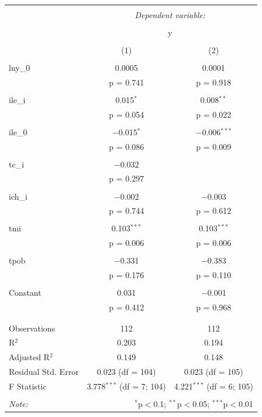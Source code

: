 \begin{table}[!htbp] \centering 
    \tiny
  \caption{} 
  \label{} 
\begin{tabular}{@{\extracolsep{5pt}}lcc} 
\\[-1.8ex]\hline 
\hline \\[-1.8ex] 
 & \multicolumn{2}{c}{\textit{Dependent variable:}} \\ 
\cline{2-3} 
\\[-1.8ex] & \multicolumn{2}{c}{y} \\ 
\\[-1.8ex] & (1) & (2)\\ 
\hline \\[-1.8ex] 
 lny\_0 & 0.0005 & 0.0001 \\ 
  & p = 0.741 & p = 0.918 \\ 
  & & \\ 
 ile\_i & 0.015$^{*}$ & 0.008$^{**}$ \\ 
  & p = 0.054 & p = 0.022 \\ 
  & & \\ 
 ile\_0 & $-$0.015$^{*}$ & $-$0.006$^{***}$ \\ 
  & p = 0.086 & p = 0.009 \\ 
  & & \\ 
 tc\_i & $-$0.032 &  \\ 
  & p = 0.297 &  \\ 
  & & \\ 
 ich\_i & $-$0.002 & $-$0.003 \\ 
  & p = 0.744 & p = 0.612 \\ 
  & & \\ 
 tmi & 0.103$^{***}$ & 0.103$^{***}$ \\ 
  & p = 0.006 & p = 0.006 \\ 
  & & \\ 
 tpob & $-$0.331 & $-$0.383 \\ 
  & p = 0.176 & p = 0.110 \\ 
  & & \\ 
 Constant & 0.031 & $-$0.001 \\ 
  & p = 0.412 & p = 0.968 \\ 
  & & \\ 
\hline \\[-1.8ex] 
Observations & 112 & 112 \\ 
R$^{2}$ & 0.203 & 0.194 \\ 
Adjusted R$^{2}$ & 0.149 & 0.148 \\ 
Residual Std. Error & 0.023 (df = 104) & 0.023 (df = 105) \\ 
F Statistic & 3.778$^{***}$ (df = 7; 104) & 4.221$^{***}$ (df = 6; 105) \\ 
\hline 
\hline \\[-1.8ex] 
\textit{Note:}  & \multicolumn{2}{r}{$^{*}$p$<$0.1; $^{**}$p$<$0.05; $^{***}$p$<$0.01} \\ 
\end{tabular} 
\end{table}




